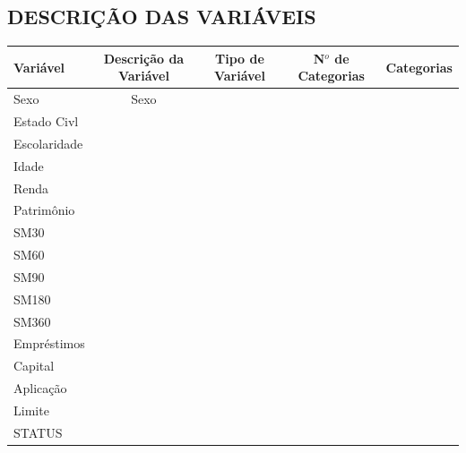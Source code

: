 \documentclass[
	12pt,				%
	openright,			%
	oneside,      %
	a4paper,			%
	english,			%
	french,				%
	spanish,			%
	brazil,				%
	]{abntex2}\usepackage[]{graphicx}\usepackage[table]{xcolor}
\theoremstyle{definition}
\begin{document}
\begin{apendicesenv}

\partapendices

\chapter{DESCRIÇÃO DAS VARIÁVEIS}
\begin{center}
  \begin{tabular}{l c c c c}
    \toprule
    Variável        & Descrição da Variável & Tipo de Variável & N$^{o}$ de Categorias & Categorias\\
    \hline
    Sexo            & Sexo    &         &       &       \\
    \hline
    Estado Civl     &         &         &       &       \\
    \hline
    Escolaridade    &         &         &       &       \\
    \hline
    Idade           &         &         &       &       \\
    \hline
    Renda           &         &         &       &       \\
    \hline
    Patrimônio      &         &         &       &       \\
    \hline
    SM30           &         &         &       &       \\
    \hline
    SM60           &         &         &       &       \\
    \hline
    SM90           &         &         &       &       \\
    \hline
    SM180          &         &         &       &       \\
    \hline
    SM360          &         &         &       &       \\
    \hline
    Empréstimos     &         &         &       &       \\
    \hline
    Capital         &         &         &       &       \\
    \hline
    Aplicação       &         &         &       &       \\
    \hline
    Limite          &         &         &       &       \\
    \hline
    STATUS          &         &         &       &       \\
    \bottomrule
  \end{tabular}
\end{center}


\end{apendicesenv}
\end{document}
